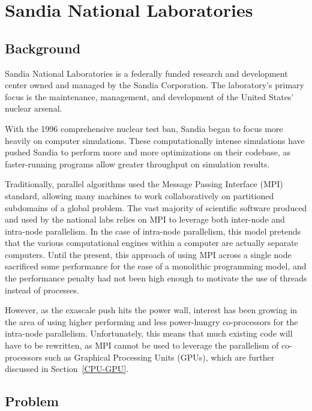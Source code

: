 
\chapter{Sandia National Laboratories}

\section{Background}

Sandia National Laboratories is a federally funded research and development
center owned and managed by the Sandia Corporation. The laboratory's primary
focus is the maintenance, management, and development of the United States'
nuclear arsenal. 

With the 1996 comprehensive nuclear test ban, Sandia began to
focus more heavily on computer simulations. These computationally intense
simulations have pushed Sandia to perform more and more optimizations on their
codebase, as faster-running programs allow greater throughput on simulation
results.

Traditionally, parallel algorithms used the Message Passing Interface (MPI)
standard, allowing many machines to work collaboratively on partitioned
subdomains of a global problem. The vast majority of scientific software
produced and used by the national labs relies on MPI to leverage both inter-node
and intra-node parallelism. In the case of intra-node parallelism, this model
pretends that the various computational engines within a computer are actually
separate computers. Until the present, this approach of using MPI across a
single node sacrificed some performance for the ease of a monolithic programming
model, and the performance penalty had not been high enough to motivate the
use of threads instead of processes. 

However, as the exascale push hits the power wall, interest has been growing in
the area of using higher performing and less power-hungry co-processors for the 
intra-node parallelism. Unfortunately, this means
that much existing code will have to be rewritten, as MPI cannot be used to
leverage the parallelism of co-processors such as Graphical Processing Units
(GPUs), which are further discussed in Section~\ref{CPU-GPU}.

\section{Problem}

